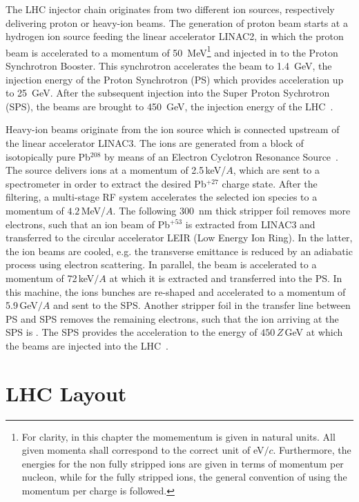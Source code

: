 The LHC injector chain originates from two different ion sources, respectively delivering proton or heavy-ion beams. The generation of proton beam starts at a hydrogen ion source feeding the linear accelerator LINAC2, in which the proton beam is accelerated to a momentum of 50~MeV\footnote{For clarity, in this chapter the momementum is given in natural units. All given momenta shall correspond to the correct unit of eV$/c$. Furthermore, the energies for the non fully stripped ions are given in terms of momentum per nucleon, while for the fully stripped ions, the general convention of using the momentum per charge is followed.} and injected in to the Proton Synchrotron Booster. This synchrotron accelerates the beam to 1.4~GeV, the injection energy of the Proton Synchrotron (PS) which provides acceleration up to 25~GeV. After the subsequent injection into the Super Proton Sychrotron (SPS), the beams are brought to 450~GeV, the injection energy of the LHC~\citedr. 
%

Heavy-ion beams originate from the ion source which is connected upstream of the linear accelerator LINAC3. The ions are generated from a block of isotopically pure Pb$^{208}$ by means of an Electron Cyclotron Resonance Source~\cite{CERN-2004-003-V1}. The source delivers ions at a momentum of 2.5\,keV/$A$, which are sent to a spectrometer in order to extract the desired Pb$^{+27}$ charge state. After the filtering, a multi-stage RF system accelerates the selected ion species to a momentum of $4.2\,$MeV/$A$. The following 300~nm thick stripper foil removes more electrons, such that an ion beam of Pb$^{+53}$ is extracted from LINAC3 and transferred to the circular accelerator LEIR (Low Energy Ion Ring). In the latter, the ion beams are cooled, e.g. the transverse emittance is reduced by an adiabatic process using electron scattering. In parallel, the beam is accelerated to a momentum of 72$\,$keV$/A$ at which it is extracted and transferred into the PS. In this machine, the ions bunches are re-shaped and accelerated to a momentum of 5.9$\,$GeV$/A$ and sent to the SPS. Another stripper foil in the transfer line between PS and SPS removes the remaining electrons, such that the ion arriving at the SPS is \lead. The SPS provides the acceleration to the energy of $450\,Z\,$GeV at which the beams are injected into the LHC~\citedr.


\section{LHC Layout}
